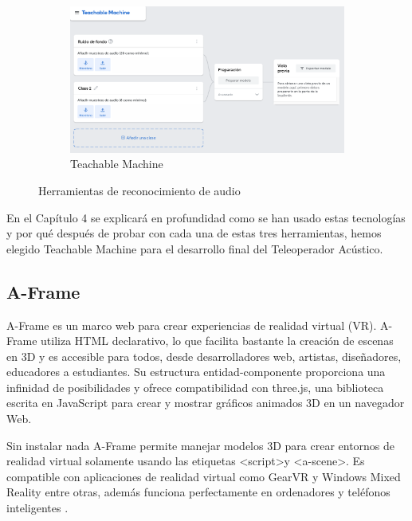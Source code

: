 \begin{figure}[H]
\begin{subfigure}{.3\linewidth}
       \includegraphics[width=1\textwidth, height=0.7\textwidth]{chapters/images/tm.png}
        \caption{Teachable Machine}
    \end{subfigure}
    \caption{Herramientas de reconocimiento de audio}
\end{figure}


En el Capítulo 4 se explicará en profundidad como se han usado estas tecnologías y por qué después de probar con cada una de estas tres herramientas, hemos elegido Teachable Machine para el desarrollo final del Teleoperador Acústico.


\subsection{A-Frame}

A-Frame es un marco web para crear experiencias de realidad virtual (VR). A-Frame utiliza HTML declarativo, lo que facilita bastante la creación de escenas en 3D y es accesible para todos, desde desarrolladores web, artistas, diseñadores, educadores a estudiantes. Su estructura entidad-componente proporciona una infinidad de posibilidades y ofrece compatibilidad con three.js, una biblioteca  escrita en JavaScript para crear y mostrar gráficos animados 3D en un navegador Web. 

Sin instalar nada A-Frame permite manejar modelos 3D para crear entornos de realidad virtual solamente usando las etiquetas \textless script\textgreater y \textless a-scene\textgreater. Es compatible con aplicaciones de realidad virtual como GearVR y Windows Mixed Reality entre otras, además funciona perfectamente en ordenadores y teléfonos inteligentes \cite{aframe}. 

